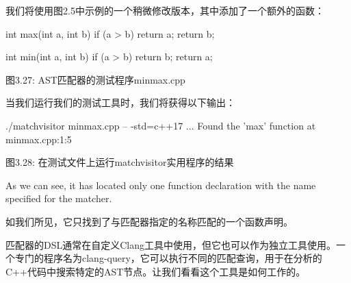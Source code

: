 我们将使用图2.5中示例的一个稍微修改版本，其中添加了一个额外的函数：

\begin{cpp}
int max(int a, int b) {
  if (a > b) return a;
    return b;
}

int min(int a, int b) {
  if (a > b) return b;
    return a;
}
\end{cpp}

\begin{center}
图3.27: AST匹配器的测试程序minmax.cpp
\end{center}

当我们运行我们的测试工具时，我们将获得以下输出：

\begin{shell}
./matchvisitor minmax.cpp -- -std=c++17
...
Found the 'max' function at minmax.cpp:1:5
\end{shell}

\begin{center}
图3.28: 在测试文件上运行matchvisitor实用程序的结果
\end{center}

As we can see, it has located only one function declaration with the name specified for the matcher.

如我们所见，它只找到了与匹配器指定的名称匹配的一个函数声明。

匹配器的DSL通常在自定义Clang工具中使用，但它也可以作为独立工具使用。一个专门的程序名为clang-query，它可以执行不同的匹配查询，用于在分析的C++代码中搜索特定的AST节点。让我们看看这个工具是如何工作的。










































